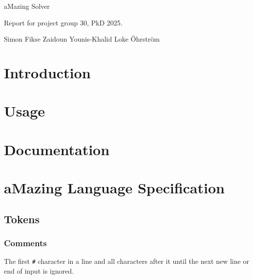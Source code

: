 \documentclass[12pt, a4paper]{article}
\begin{document}
\begin{titlepage}

    \begin{center}

        \begin{LARGE}
            aMazing Solver
        \end{LARGE}

        \vspace{5mm}

        \begin{large}
            Report for project group 30, PkD 2025.
        \end{large}

        \vspace{5mm}

        Simon Fikse \quad Zaidoun Younis-Khalid \quad Loke Öhrström

    \end{center}
\end{titlepage}

\newpage
\tableofcontents
\newpage

\section{Introduction}

\section{Usage}

\section{Documentation}

\newpage

\section{aMazing Language Specification}

\subsection{Tokens}

\subsubsection{Comments}

The first \verb|#| character in a line and all characters after it until the next new line or end of input is ignored.
\end{document}
